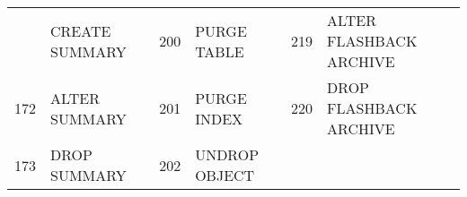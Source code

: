 \begin{longtable}[]{@{}llllll@{}}
\begin{minipage}[t]{0.06\columnwidth}
\end{minipage} & \begin{minipage}[t]{0.19\columnwidth}\raggedright\strut
CREATE SUMMARY\strut
\end{minipage} & \begin{minipage}[t]{0.06\columnwidth}\raggedright\strut
200\strut
\end{minipage} & \begin{minipage}[t]{0.24\columnwidth}\raggedright\strut
PURGE TABLE\strut
\end{minipage} & \begin{minipage}[t]{0.06\columnwidth}\raggedright\strut
219\strut
\end{minipage} & \begin{minipage}[t]{0.24\columnwidth}\raggedright\strut
ALTER FLASHBACK ARCHIVE\strut
\end{minipage}\tabularnewline
\begin{minipage}[t]{0.06\columnwidth}\raggedright\strut
172\strut
\end{minipage} & \begin{minipage}[t]{0.19\columnwidth}\raggedright\strut
ALTER SUMMARY\strut
\end{minipage} & \begin{minipage}[t]{0.06\columnwidth}\raggedright\strut
201\strut
\end{minipage} & \begin{minipage}[t]{0.24\columnwidth}\raggedright\strut
PURGE INDEX\strut
\end{minipage} & \begin{minipage}[t]{0.06\columnwidth}\raggedright\strut
220\strut
\end{minipage} & \begin{minipage}[t]{0.24\columnwidth}\raggedright\strut
DROP FLASHBACK ARCHIVE\strut
\end{minipage}\tabularnewline
\begin{minipage}[t]{0.06\columnwidth}\raggedright\strut
173\strut
\end{minipage} & \begin{minipage}[t]{0.19\columnwidth}\raggedright\strut
DROP SUMMARY\strut
\end{minipage} & \begin{minipage}[t]{0.06\columnwidth}\raggedright\strut
202\strut
\end{minipage} & \begin{minipage}[t]{0.24\columnwidth}\raggedright\strut
UNDROP OBJECT\strut
\end{minipage} & \begin{minipage}[t]{0.06\columnwidth}\raggedright\strut

\end{minipage}
\end{longtable}
